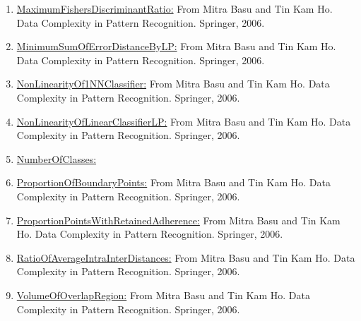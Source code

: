 \documentclass[a4paper,12pt, english]{article}
\begin{document}
\begin{enumerate}
	\item \underline{MaximumFishersDiscriminantRatio:}  From Mitra Basu and Tin Kam Ho. Data Complexity in Pattern Recognition. Springer, 2006.
	\item \underline{MinimumSumOfErrorDistanceByLP:}  From Mitra Basu and Tin Kam Ho. Data Complexity in Pattern Recognition. Springer, 2006.
	\item \underline{NonLinearityOf1NNClassifier:}  From Mitra Basu and Tin Kam Ho. Data Complexity in Pattern Recognition. Springer, 2006.
	\item \underline{NonLinearityOfLinearClassifierLP:}  From Mitra Basu and Tin Kam Ho. Data Complexity in Pattern Recognition. Springer, 2006.
	\item \underline{NumberOfClasses:}
	\item \underline{ProportionOfBoundaryPoints:}  From Mitra Basu and Tin Kam Ho. Data Complexity in Pattern Recognition. Springer, 2006.
	\item \underline{ProportionPointsWithRetainedAdherence:}  From Mitra Basu and Tin Kam Ho. Data Complexity in Pattern Recognition. Springer, 2006.
	\item \underline{RatioOfAverageIntraInterDistances:}  From Mitra Basu and Tin Kam Ho. Data Complexity in Pattern Recognition. Springer, 2006.
	\item \underline{VolumeOfOverlapRegion:}  From Mitra Basu and Tin Kam Ho. Data Complexity in Pattern Recognition. Springer, 2006.
	\end{enumerate}	  
\end{document}
